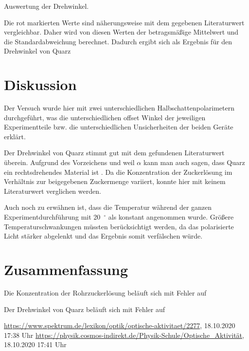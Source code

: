 \documentclass{article}
\begin{document}
\begin{table}[H]
\caption{Auswertung der Drehwinkel.}
\label{tab:kristall_auswertung}
\centering

\end{table}


Die rot markierten Werte sind näherungsweise mit dem gegebenen Literaturwert vergleichbar. Daher wird von diesen Werten der betragsmäßige Mittelwert und die Standardabweichung berechnet. Dadurch ergibt sich als Ergebnis für den Drehwinkel von Quarz 




\section{Diskussion}
Der Versuch wurde hier mit zwei unterschiedlichen Halbschattenpolarimetern durchgeführt, was die unterschiedlichen offset Winkel der jeweiligen Experimentteile bzw. die unterschiedlichen Unsicherheiten der beiden Geräte erklärt.

Der Drehwinkel von Quarz stimmt gut mit dem gefundenen Literaturwert \cite{spektrum} überein. Aufgrund des Vorzeichens und weil $\alpha$ kann man auch sagen, dass Quarz ein rechtsdrehendes Material ist \cite{cosmos}.
Da die Konzentration der Zuckerlösung im Verhältnis zur beigegebenen Zuckermenge variiert, konnte hier mit keinem Literaturwert verglichen werden.

Auch noch zu erwähnen ist, dass die Temperatur während der ganzen Experimentdurchführung mit 20~$^\circ$ als konstant angenommen wurde. Größere Temperaturschwankungen müssten berücksichtigt werden, da das polarisierte Licht stärker abgelenkt und das Ergebnis somit verfälschen würde.




\section{Zusammenfassung}
Die Konzentration der Rohrzuckerlösung beläuft sich mit Fehler auf


Der Drehwinkel von Quarz beläuft sich mit Fehler auf



\begin{thebibliography}{9}
 \url{https://www.spektrum.de/lexikon/optik/optische-aktivitaet/2277}, 18.10.2020 17:38 Uhr
 \url{https://physik.cosmos-indirekt.de/Physik-Schule/Optische_Aktivität}, 18.10.2020 17:41 Uhr
\end{thebibliography}
\end{document}
